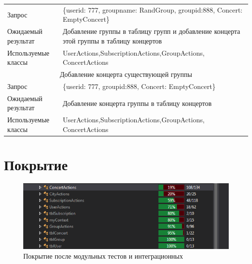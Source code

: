 \begin{table}
\begin{center}
\begin{tabular}{|l|p{10cm}|}
\hline
Запрос & \{userid: 777, groupname: RandGroup, groupid:888, Concert: EmptyConcert\} \\
Ожидаемый результат & Добавление группы в таблицу групп и добавление концерта этой группы в таблицу концертов \\
Используемые классы & UserActions,SubscriptionActions,GroupActions, ConcertActions  \\
\hline
\multicolumn{2}{|c|}{Добавление концерта существующей группы} \\
\hline
Запрос & \{userid: 777, groupid:888, Concert: EmptyConcert\} \\
Ожидаемый результат & Добавление концерта группы в таблицу концертов \\
Используемые классы & UserActions,SubscriptionActions,GroupActions, ConcertActions  \\
\hline

\end{tabular}
\end{center}
\end{table} 
\newpage
\section{Покрытие}
\begin{figure}
	\centering
	\includegraphics[scale=1]{CoverIntegration.PNG}
	\caption{Покрытие после модульных тестов и интеграционных}
	\label{image:cover-integration}
\end{figure}